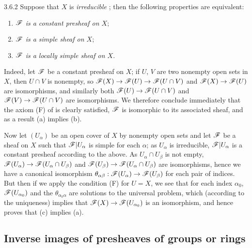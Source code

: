 \begin{env}{3.6.2}
\label{env-0.3.6.2}
Suppose that $X$ is \emph{irreducible} ; then the following
properties are equivalent:
\begin{enumerate}[label=(\alph*)]
  \item \emph{$\mathscr{F}$ is a constant presheaf on $X$};
  \item \emph{$\mathscr{F}$ is a simple sheaf on $X$};
  \item \emph{$\mathscr{F}$ is a locally simple sheaf on $X$}.
\end{enumerate}
\end{env}

Indeed, let $\mathscr{F}$ be a constant presheaf on $X$; if $U$, $V$ are two nonempty
open sets in $X$, then $U\cap V$ is nonempty, so
$\mathscr{F}(X)\to\mathscr{F}(U)\to\mathscr{F}(U\cap V)$ and $\mathscr{F}(X)\to\mathscr{F}(U)$ are
isomorphisms, and similarly both $\mathscr{F}(U)\to\mathscr{F}(U\cap V)$ and
$\mathscr{F}(V)\to\mathscr{F}(U\cap V)$ are isomorphisms. We therefore conclude
immediately that the axiom (F) of  is clearly satisfied,
$\mathscr{F}$ is isomorphic to its associated sheaf, and as a result (a) implies (b).

Now let $(U_\alpha)$ be an open cover of $X$ by nonempty open sets and let
$\mathscr{F}$ be a sheaf on $X$ such that $\mathscr{F}|U_\alpha$ is simple for each
$\alpha$; as $U_\alpha$ is irreducible, $\mathscr{F}|U_\alpha$ is a constant presheaf
according to the above. As $U_\alpha\cap U_\beta$ is not empty,
$\mathscr{F}(U_\alpha)\to\mathscr{F}(U_\alpha\cap U_\beta)$ and
$\mathscr{F}(U_\beta)\to\mathscr{F}(U_\alpha\cap U_\beta)$ are isomorphisms, hence we have
a canonical isomorphism
$\theta_{\alpha\beta}:\mathscr{F}(U_\alpha)\to\mathscr{F}(U_\beta)$ for each pair of
indices. But then if we apply the condition (F) for $U=X$, we see that for each
index $\alpha_0$, $\mathscr{F}(U_{\alpha_0})$ and the $\theta_{\alpha_0\alpha}$ are
solutions to the universal problem, which (according to the uniqueness) implies
that $\mathscr{F}(X)\to\mathscr{F}(U_{\alpha_0})$ is an isomorphism, and hence proves that
(c) implies (a).

\subsection{Inverse images of presheaves of groups or rings}
\label{0-prelim-3.7}

